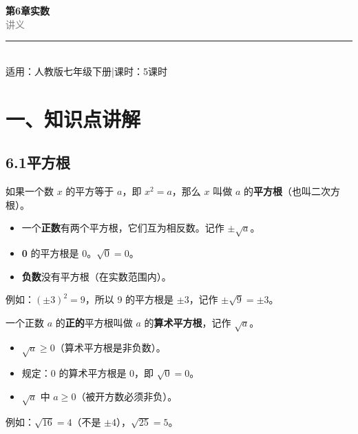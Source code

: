 \documentclass[12pt, a4paper]{ctexart}
\begin{document}
\begin{center}
{\Huge\bfseries\textcolor{mainblue}{第6章\quad 实数}}\\[12pt]
{\Large\textcolor{gray}{讲\quad 义}}\\[8pt]
\rule{0.6\textwidth}{1pt}\\[8pt]
{\normalsize 适用：人教版\quad 七年级下册\quad |\quad 课时：5课时}
\end{center}
\vspace{10pt}

\section*{\textcolor{mainblue}{一、知识点讲解}}

\subsection*{6.1\quad 平方根}

\begin{knowledgebox}
如果一个数 $x$ 的平方等于 $a$，即 $x^2 = a$，那么 $x$ 叫做 $a$ 的\textbf{平方根}（也叫二次方根）。

\begin{itemize}[leftmargin=2em]
  \item 一个\textbf{正数}有两个平方根，它们互为相反数。记作 $\pm\sqrt{a}$。
  \item \textbf{0} 的平方根是 0。$\sqrt{0} = 0$。
  \item \textbf{负数}没有平方根（在实数范围内）。
\end{itemize}

例如：$(\pm 3)^2 = 9$，所以 9 的平方根是 $\pm 3$，记作 $\pm\sqrt{9} = \pm 3$。
\end{knowledgebox}

\begin{knowledgebox}
一个正数 $a$ 的\textbf{正的}平方根叫做 $a$ 的\textbf{算术平方根}，记作 $\sqrt{a}$。

\begin{itemize}[leftmargin=2em]
  \item $\sqrt{a} \geq 0$（算术平方根是非负数）。
  \item 规定：0 的算术平方根是 0，即 $\sqrt{0} = 0$。
  \item $\sqrt{a}$ 中 $a \geq 0$（被开方数必须非负）。
\end{itemize}

例如：$\sqrt{16} = 4$（不是 $\pm 4$），$\sqrt{25} = 5$。
\end{knowledgebox}
\end{document}

